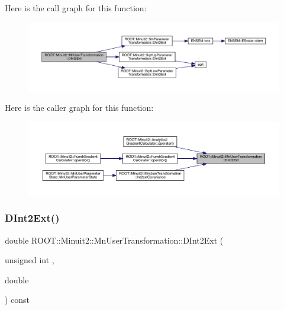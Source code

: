 Here is the call graph for this function\+:\nopagebreak
\begin{figure}[H]
\begin{center}
\leavevmode
\includegraphics[width=350pt]{d9/d98/classROOT_1_1Minuit2_1_1MnUserTransformation_a35938acd16a546d398ce1c00ffc98c44_cgraph}
\end{center}
\end{figure}
Here is the caller graph for this function\+:\nopagebreak
\begin{figure}[H]
\begin{center}
\leavevmode
\includegraphics[width=350pt]{d9/d98/classROOT_1_1Minuit2_1_1MnUserTransformation_a35938acd16a546d398ce1c00ffc98c44_icgraph}
\end{center}
\end{figure}
\mbox{\label{classROOT_1_1Minuit2_1_1MnUserTransformation_a35938acd16a546d398ce1c00ffc98c44}} 
\subsubsection{\texorpdfstring{DInt2Ext()}{DInt2Ext()}\hspace{0.1cm}{\footnotesize\ttfamily [2/2]}}
{\footnotesize\ttfamily double R\+O\+O\+T\+::\+Minuit2\+::\+Mn\+User\+Transformation\+::\+D\+Int2\+Ext (\begin{DoxyParamCaption}\item[{unsigned int}]{,  }\item[{double}]{ }\end{DoxyParamCaption}) const}

